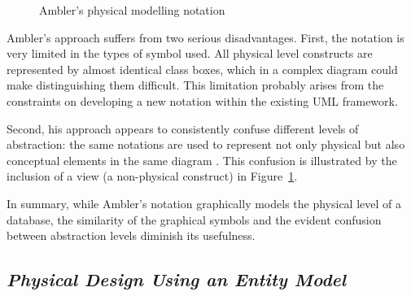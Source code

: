 \documentclass{CRPITStyle}
\begin{document}
\begin{figure}[htb]
	\caption{Ambler's physical modelling notation \protect{}}
	\label{fig-Ambler}
\end{figure}

Ambler's approach suffers from two serious disadvantages. First, the
notation is very limited in the types of symbol used. All physical level
constructs are represented by almost identical class boxes, which in a
complex diagram could make distinguishing them difficult. This
limitation probably arises from the constraints on developing a new
notation within the existing UML framework.

Second, his approach appears to consistently confuse different levels of
abstraction: the same notations are used to represent not only physical
but also conceptual elements in the same diagram
\cite{Ambl-SW-2003-ADT}. This confusion is illustrated by the inclusion
of a view (a non-physical construct) in Figure~\ref{fig-Ambler}.

In summary, while Ambler's notation graphically models the physical
level of a database, the similarity of the graphical symbols and the
evident confusion between abstraction levels diminish its usefulness.


\subsection{\emph{Physical Design Using an Entity Model}}
\end{document}

